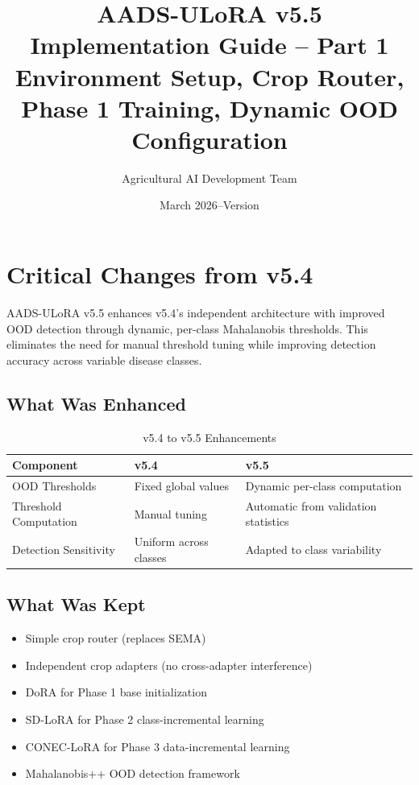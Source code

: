 \documentclass[11pt,a4paper]{article}
\title{\textbf{AADS-ULoRA v5.5 Implementation Guide -- Part 1}\\Environment Setup, Crop Router, Phase 1 Training, Dynamic OOD Configuration}
\author{Agricultural AI Development Team}
\date{March 2026--Version}
\begin{document}
\maketitle

\tableofcontents
\newpage

\section{Critical Changes from v5.4}

AADS-ULoRA v5.5 enhances v5.4's independent architecture with improved OOD detection through dynamic, per-class Mahalanobis thresholds. This eliminates the need for manual threshold tuning while improving detection accuracy across variable disease classes.

\subsection{What Was Enhanced}

\begin{table}[H]
\centering
\caption{v5.4 to v5.5 Enhancements}
\begin{tabular}{lll}
\toprule
\textbf{Component} & \textbf{v5.4} & \textbf{v5.5} \\
\midrule
OOD Thresholds & Fixed global values & Dynamic per-class computation \\
Threshold Computation & Manual tuning & Automatic from validation statistics \\
Detection Sensitivity & Uniform across classes & Adapted to class variability \\
\bottomrule
\end{tabular}
\end{table}

\subsection{What Was Kept}

\begin{itemize}[leftmargin=*]
    \item Simple crop router (replaces SEMA)
    \item Independent crop adapters (no cross-adapter interference)
    \item DoRA for Phase 1 base initialization
    \item SD-LoRA for Phase 2 class-incremental learning
    \item CONEC-LoRA for Phase 3 data-incremental learning
    \item Mahalanobis++ OOD detection framework
\end{itemize}
\end{document}
